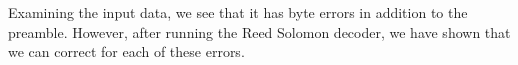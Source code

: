 \documentclass[conference,onecolumn]{IEEEtran}
\begin{document}
Examining the input data, we see that it has byte errors in addition to the preamble. However, after running the Reed Solomon decoder, we have shown that we can correct for each of these errors.

\printbibliography

\end{document}
